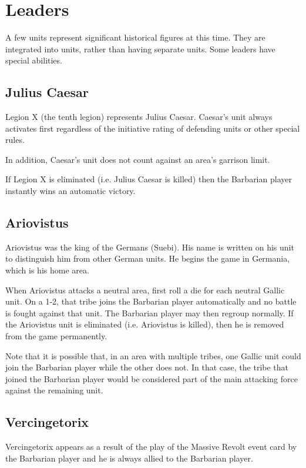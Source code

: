 \section{Leaders}
\par
A few units represent significant historical figures at this time. They are integrated into units, rather than having separate units. Some leaders have special abilities.

\subsection{Julius Caesar}
\par
Legion X (the tenth legion) represents Julius Caesar. Caesar’s unit always activates first regardless of the initiative rating of defending units or other special rules.

In addition, Caesar’s unit does not count against an area’s garrison limit.

If Legion X is eliminated (i.e. Julius Caesar is killed) then the Barbarian player instantly wins an automatic victory.

\subsection{Ariovistus}
\par
Ariovistus was the king of the Germans (Suebi). His name is written on his unit to distinguish him from other German units. He begins the game in Germania, which is his home area.

When Ariovistus attacks a neutral area, first roll a die for each neutral Gallic unit. On a 1-2, that tribe joins the Barbarian player automatically and no battle is fought against that unit. The Barbarian player may then regroup normally. If the Ariovistus unit is eliminated (i.e. Ariovistus is killed), then he is removed from the game permanently.

Note that it is possible that, in an area with multiple tribes, one Gallic unit could join the Barbarian player while the other does not. In that case, the tribe that joined the Barbarian player would be considered part of the main attacking force against the remaining unit.

\subsection{Vercingetorix}
\par
Vercingetorix appears as a result of the play of the Massive Revolt event card by the Barbarian player and he is always allied to the Barbarian player.

